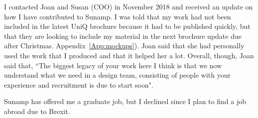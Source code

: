 I contacted Joan and Susan (COO) in November 2018 and received an update on how I have contributed to Sunamp.
I was told that my work had not been included in the latest UniQ brochure because it had to be published quickly, but that they are looking to include my material in the next brochure update due after Christmas.
 Appendix~\ref{App:mockups}).
Joan said that she had personally used the work that I produced and that it helped her a lot.
Overall, though, Joan said that, ``The biggest legacy of your work here I think is that we now understand what we need in a design team, consisting of people with your experience and recruitment is due to start soon".

Sunamp has offered me a graduate job, but I declined since I plan to find a job abroad due to Brexit.
